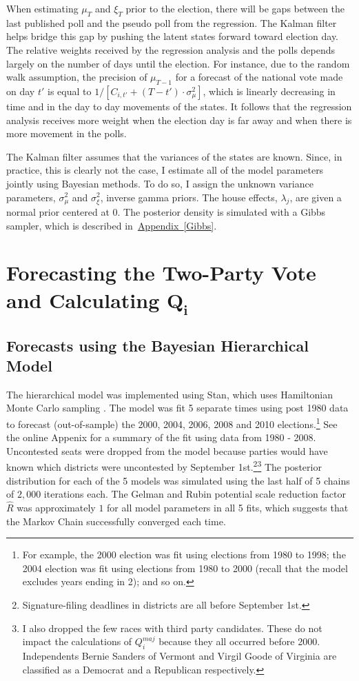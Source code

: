 \documentclass[12pt,final,fleqn]{article}
\newcommand{\aref}[1]{\hyperref[#1]{Appendix~\ref{#1}}}
\theoremstyle{plain}
\begin{document}
When estimating $\mu_T$ and $\xi_T$ prior to the election, there will be gaps between the last published poll and the pseudo poll from the regression. The Kalman filter helps bridge this gap by pushing the latent states forward toward election day. The relative weights received by the regression analysis and the polls depends largely on the number of days until the election. For instance, due to the random walk assumption, the precision of $\mu_{T-1}$ for a forecast of the national vote made on day $t'$ is equal to $1/\left[C_{i,t'} + (T-t')\cdot \sigma^2_\mu\right]$, which is linearly decreasing in time and in the day to day movements of the states. It follows that the regression analysis receives more weight when the election day is far away and when there is more movement in the polls.  

The Kalman filter assumes that the variances of the states are known. Since, in practice, this is clearly not the case, I estimate all of the model parameters jointly using Bayesian methods. To do so, I assign the unknown variance parameters, $\sigma_\mu^2$ and $\sigma_\xi^2$, inverse gamma priors. The house effects, $\lambda_j$, are given a normal prior centered at $0$. The posterior density is simulated with a Gibbs sampler, which is described in~\aref{Gibbs}.

\section{Forecasting the Two-Party Vote and Calculating $\mathbf{Q_i}$}
\subsection{Forecasts using the Bayesian Hierarchical Model} \label{sec: results hierarchical model}
The hierarchical model was implemented using Stan, which uses Hamiltonian Monte Carlo sampling \citep{dev2016rstan}. The model was fit 5 separate times using post 1980 data to forecast (out-of-sample) the 2000, 2004, 2006, 2008 and 2010 elections.\footnote{For example, the 2000 election was fit using elections from 1980 to 1998; the 2004 election was fit using elections from 1980 to 2000 (recall that the model excludes years ending in 2); and so on.} See the online Appenix for a summary of the fit using data from 1980 - 2008. Uncontested seats were dropped from the model because parties would have known which districts were uncontested by September 1st.\footnote{Signature-filing deadlines in districts are all before September 1st.}\footnote{I also dropped the few races with third party candidates. These do not impact the calculations of $Q_i^{maj}$ because they all occurred before 2000. Independents Bernie Sanders of Vermont and Virgil Goode of Virginia are classified as a Democrat and a Republican respectively. } The posterior distribution for each of the 5 models was simulated using the last half of 5 chains of $2,000$ iterations each. The Gelman and Rubin potential scale reduction factor $\hat{R}$ was approximately $1$ for all model parameters in all 5 fits, which suggests that the Markov Chain successfully converged each time.
\end{document}
